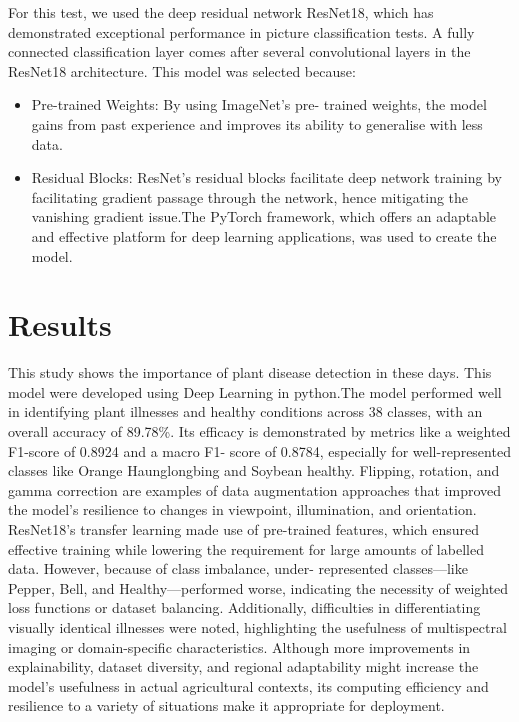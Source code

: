 \documentclass[conference]{IEEEtran}
\begin{document}
For this test, we used the deep residual network ResNet18, which has demonstrated exceptional performance in picture classification tests. A fully connected classification layer comes after several convolutional layers in the ResNet18 architecture. This model was selected because:
\begin{itemize}
    \item Pre-trained Weights: By using ImageNet's pre- trained weights, the model gains from past experience and improves its ability to generalise with less data.
    \item Residual Blocks: ResNet's residual blocks facilitate deep network training by facilitating gradient passage through the network, hence mitigating the vanishing gradient issue.The PyTorch framework, which offers an adaptable and effective platform for deep learning applications, was used to create the model.
\end{itemize}

\section{\textbf{Results}}
This study shows the importance of plant disease detection in these days. This model were developed using Deep Learning in python.The model performed well in identifying plant illnesses and healthy conditions across 38 classes, with an overall accuracy of 89.78\%. Its efficacy is demonstrated by metrics like a weighted F1-score of 0.8924 and a macro F1- score of 0.8784, especially for well-represented classes like Orange	Haunglongbing and Soybean	healthy. Flipping, rotation, and gamma correction are examples of data augmentation approaches that improved the model's resilience to changes in viewpoint, illumination, and orientation. ResNet18's transfer learning made use of pre-trained features, which ensured effective training while lowering the requirement for large amounts of labelled data. However, because of class imbalance, under- represented classes—like Pepper, Bell, and Healthy—performed worse, indicating the necessity of weighted loss functions or dataset balancing. Additionally, difficulties in differentiating visually identical illnesses were noted, highlighting the usefulness of multispectral imaging or domain-specific characteristics.
Although more improvements in explainability, dataset diversity, and regional adaptability might increase the model's usefulness in actual agricultural contexts, its computing efficiency and resilience to a variety of situations make it appropriate for deployment.
\end{document}
